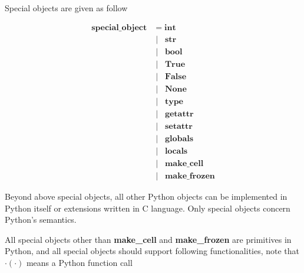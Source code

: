 \documentclass[12pt, a4paper]{report}
\begin{document}
Special objects are given as follow

\begin{equation}
\begin{split}
\mathbf{special\_object} & =
                   \mathbf{int}   \\
       & \;|\;\;\; \mathbf{str}   \\
       & \;|\;\;\; \mathbf{bool}  \\
       & \;|\;\;\; \mathbf{True}  \\
       & \;|\;\;\; \mathbf{False} \\
       & \;|\;\;\; \mathbf{None}  \\
       & \;|\;\;\; \mathbf{type}      \\
       & \;|\;\;\; \mathbf{getattr}   \\
       & \;|\;\;\; \mathbf{setattr}   \\
       & \;|\;\;\; \mathbf{globals} \\
       & \;|\;\;\; \mathbf{locals} \\
       & \;|\;\;\; \mathbf{make\_cell} \\
       & \;|\;\;\; \mathbf{make\_frozen}
\end{split}
\end{equation}

Beyond above special objects, all other Python objects can be implemented in Python itself or extensions written in C language. Only special objects concern Python's semantics.

All special objects other than \textbf{make\_cell} and \textbf{make\_frozen} are primitives in Python,
and all special objects should support following functionalities, note that $\cdot(\cdot)$ means a Python function call
\end{document}

